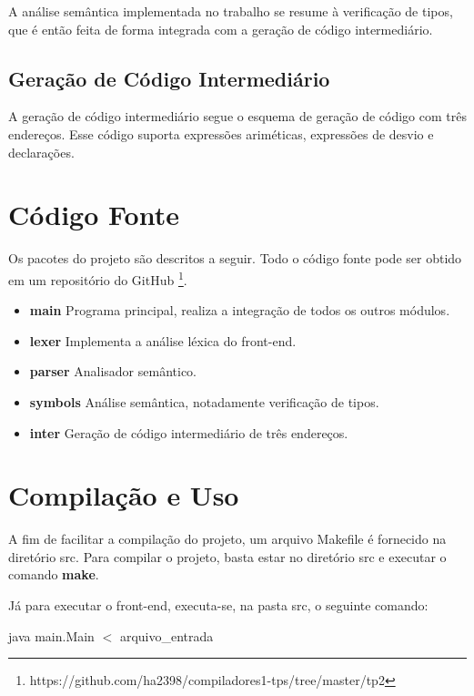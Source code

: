 \documentclass[a4paper,12pt]{report}
\begin{document}
A análise semântica implementada no trabalho se resume à verificação de tipos, que é então feita de forma 
integrada com a geração de código intermediário.

\subsection{Geração de Código Intermediário}

A geração de código intermediário segue o esquema de geração de código com três endereços. Esse código 
suporta expressões ariméticas, expressões de desvio e declarações.

\section{Código Fonte} \label{sec:cf}

Os pacotes do projeto são descritos a seguir. Todo o código fonte pode ser obtido em um repositório do GitHub
\footnote{https://github.com/ha2398/compiladores1-tps/tree/master/tp2}.

\begin{itemize}
 \item \textbf{main} Programa principal, realiza a integração de todos os outros módulos.
 
 \item \textbf{lexer} Implementa a análise léxica do front-end.
 
 \item \textbf{parser} Analisador semântico.
 
 \item \textbf{symbols} Análise semântica, notadamente verificação de tipos.
 
 \item \textbf{inter} Geração de código intermediário de três endereços.
\end{itemize}

\section{Compilação e Uso}

A fim de facilitar a compilação do projeto, um arquivo Makefile é fornecido na diretório src. Para
compilar o projeto, basta estar no diretório src e executar o comando \textbf{make}.

Já para executar o front-end, executa-se, na pasta src, o seguinte comando:

\begin{center}
 java main.Main $ < $ arquivo\_entrada
\end{center}
\end{document}

